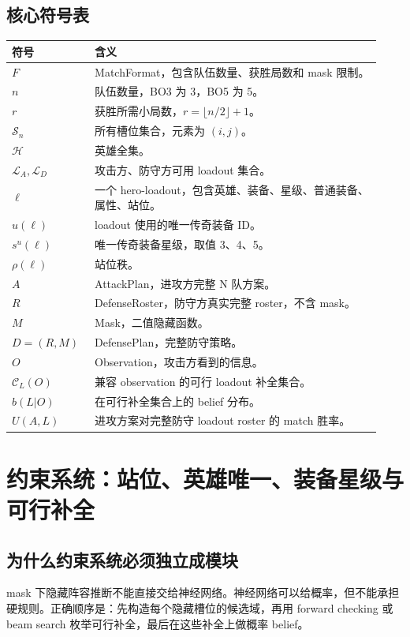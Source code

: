 \documentclass[UTF8,12pt,openany]{ctexbook}
\newcommand{\Hcal}{\mathcal{H}}
\newcommand{\Lcal}{\mathcal{L}}
\newcommand{\Scal}{\mathcal{S}}
\newcommand{\Ccal}{\mathcal{C}}
\begin{document}
\section{核心符号表}
\begin{longtable}{p{0.20\linewidth}p{0.73\linewidth}}
\toprule
符号 & 含义 \\
\midrule
$F$ & MatchFormat，包含队伍数量、获胜局数和 mask 限制。\\
$n$ & 队伍数量，BO3 为 3，BO5 为 5。\\
$r$ & 获胜所需小局数，$r=\lfloor n/2\rfloor+1$。\\
$\Scal_n$ & 所有槽位集合，元素为 $(i,j)$。\\
$\Hcal$ & 英雄全集。\\
$\Lcal_A,\Lcal_D$ & 攻击方、防守方可用 loadout 集合。\\
$\ell$ & 一个 hero-loadout，包含英雄、装备、星级、普通装备、属性、站位。\\
$u(\ell)$ & loadout 使用的唯一传奇装备 ID。\\
$s^u(\ell)$ & 唯一传奇装备星级，取值 3、4、5。\\
$\rho(\ell)$ & 站位秩。\\
$A$ & AttackPlan，进攻方完整 N 队方案。\\
$R$ & DefenseRoster，防守方真实完整 roster，不含 mask。\\
$M$ & Mask，二值隐藏函数。\\
$D=(R,M)$ & DefensePlan，完整防守策略。\\
$O$ & Observation，攻击方看到的信息。\\
$\Ccal_L(O)$ & 兼容 observation 的可行 loadout 补全集合。\\
$b(L|O)$ & 在可行补全集合上的 belief 分布。\\
$U(A,L)$ & 进攻方案对完整防守 loadout roster 的 match 胜率。\\
\bottomrule
\end{longtable}


\chapter{约束系统：站位、英雄唯一、装备星级与可行补全}

\section{为什么约束系统必须独立成模块}
mask 下隐藏阵容推断不能直接交给神经网络。神经网络可以给概率，但不能承担硬规则。正确顺序是：先构造每个隐藏槽位的候选域，再用 forward checking 或 beam search 枚举可行补全，最后在这些补全上做概率 belief。
\end{document}

